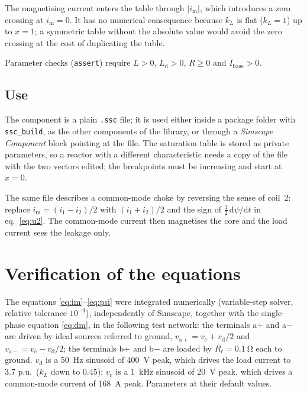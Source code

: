 \documentclass[11pt,a4paper]{article}
\begin{document}
The magnetising current enters the table through $|i_\mathrm{m}|$, which introduces a
zero crossing at $i_\mathrm{m} = 0$. It has no numerical consequence because $k_L$ is
flat ($k_L = 1$) up to $x = 1$; a symmetric table without the absolute value would avoid
the zero crossing at the cost of duplicating the table.

Parameter checks (\texttt{assert}) require $L > 0$, $L_\mathrm{d} > 0$, $R \ge 0$ and
$I_\mathrm{base} > 0$.

\subsection{Use}

The component is a plain \texttt{.ssc} file; it is used either inside a package folder
with \texttt{ssc\_build}, as the other components of the library, or through a
\emph{Simscape Component} block pointing at the file. The saturation table is stored as
private parameters, so a reactor with a different characteristic needs a copy of the
file with the two vectors edited; the breakpoints must be increasing and start at
$x = 0$.

The same file describes a common-mode choke by reversing the sense of coil~2: replace
$i_\mathrm{m} = (i_1 - i_2)/2$ with $(i_1 + i_2)/2$ and the sign of
$\tfrac{1}{2}\,\mathrm{d}\psi/\mathrm{d}t$ in eq.~\eqref{eq:u2}. The common-mode
current then magnetises the core and the load current sees the leakage only.

\section{Verification of the equations}
\label{sec:ver}

The equations \eqref{eq:im}--\eqref{eq:psi} were integrated numerically (variable-step
solver, relative tolerance $10^{-9}$), independently of Simscape, together with the
single-phase equation \eqref{eq:dm}, in the following test network: the terminals a$+$
and a$-$ are driven by ideal sources referred to ground,
$v_{\mathrm{a}+} = v_\mathrm{c} + v_\mathrm{d}/2$ and
$v_{\mathrm{a}-} = v_\mathrm{c} - v_\mathrm{d}/2$; the terminals b$+$ and b$-$ are loaded
by $R_\ell = \SI{0.1}{\ohm}$ each to ground. $v_\mathrm{d}$ is a \SI{50}{\hertz}
sinusoid of \SI{400}{\volt} peak, which drives the load current to $3.7$ p.u.\ ($k_L$
down to $0.45$); $v_\mathrm{c}$ is a \SI{1}{\kilo\hertz} sinusoid of \SI{20}{\volt}
peak, which drives a common-mode current of \SI{168}{\ampere} peak. Parameters at their
default values.
\end{document}
